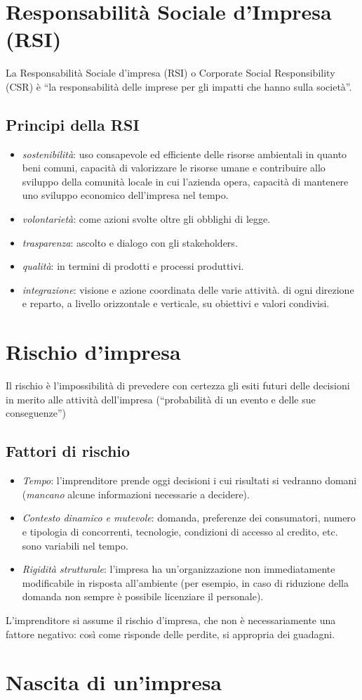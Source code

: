 \documentclass[10pt,a4paper,fleqn,oneside]{book}
\begin{document}
\section{Responsabilità Sociale d'Impresa (RSI)}
La Responsabilità Sociale d’impresa (RSI) o Corporate Social Responsibility
(CSR) è ``la responsabilità delle imprese per gli impatti che hanno sulla
società''.

\subsection{Principi della RSI}
\begin{itemize}
    \item \emph{sostenibilità}: uso consapevole ed efficiente delle risorse
    ambientali in quanto beni comuni, capacità di valorizzare le risorse umane
    e contribuire allo sviluppo della comunità locale in cui l’azienda opera,
    capacità di mantenere uno sviluppo economico dell’impresa nel tempo.
    \item \emph{volontarietà}: come azioni svolte oltre gli obblighi di legge.
    \item \emph{trasparenza}: ascolto e dialogo con gli \glspl{stakeholder}.
    \item \emph{qualità}: in termini di prodotti e processi produttivi.
    \item \emph{integrazione}: visione e azione coordinata delle varie attività.
    di ogni direzione e reparto, a livello orizzontale e verticale, su obiettivi
    e valori condivisi.
\end{itemize}

\section{Rischio d'impresa}
Il \gls{rischio} è l'impossibilità di prevedere con certezza gli esiti futuri delle decisioni
in merito alle attività dell’impresa (``probabilità di un evento e delle sue
conseguenze'')

\subsection{Fattori di rischio}
\begin{itemize}
    \item \emph{Tempo}: l'imprenditore prende oggi decisioni i cui risultati si
    vedranno domani (\emph{mancano} alcune informazioni necessarie a decidere).
    \item \emph{Contesto dinamico e mutevole}: domanda, preferenze dei
    consumatori, numero e tipologia di concorrenti, tecnologie, condizioni di
    accesso al credito, etc. sono variabili nel tempo.
    \item \emph{Rigidità strutturale}: l’impresa ha un’organizzazione non
    immediatamente modificabile in risposta all’ambiente (per esempio, in caso
    di riduzione della domanda non sempre è possibile licenziare il personale).
\end{itemize}

L'imprenditore si assume il rischio d'impresa, che non è necessariamente una
fattore negativo: così come risponde delle perdite, si appropria dei guadagni.

\section{Nascita di un'impresa}


\printglossaries
\end{document}
